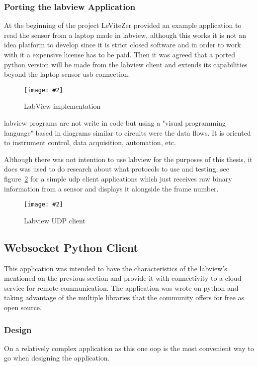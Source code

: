 \documentclass[hidelinks,11pt,a4paper,oneside,article]{memoir}
\newcommand{\putimage}[3][10] %
{
\begin{figure}[h]
	\centering
	\captionsetup{justification=centering}
	\texttt{[image: \#2]}
	\caption{#3}
	\label{fig:#2}
\end{figure}
}
\begin{document}
\subsubsection{Porting the \gls{labview} Application}
At the beginning of the project LeViteZer provided an example application to read the sensor from a laptop made in \gls{labview}, although this works it is not an idea platform to develop since it is strict closed software and in order to work with it a expensive license has to be paid. Then it was agreed that a ported python version will be made from the \gls{labview} client and extends its capabilities beyond the laptop-sensor \gls{usb} connection.

    \putimage{labview}{LabView implementation}
    
\gls{labview} programs are not write in code but using a "visual programming language" based in diagrams similar to circuits were the data flows. It is oriented to instrument control, data acquisition, automation, etc.~\cite{labview}

Although there was not intention to use \gls{labview} for the purposes of this thesis, it does was used to do research about what protocols to use and testing, see figure~\ref{fig:labview-udp} for a simple \gls{udp} client applications which just receives raw binary information from a sensor and displays it alongside the frame number.

    \putimage{labview-udp}{Labview UDP client}

\subsection{Websocket Python Client}\label{sec:websocket-python-client}
This application was intended to have the characteristics of the \gls{labview}'s mentioned on the previous section and provide it with connectivity to a cloud service for remote communication. The application was wrote on python and taking advantage of the multiple libraries that the community offers for free as open source.


\subsubsection{Design}
On a relatively complex application as this one  \gls{oop} is the most convenient way to go when designing the application.
\end{document}
